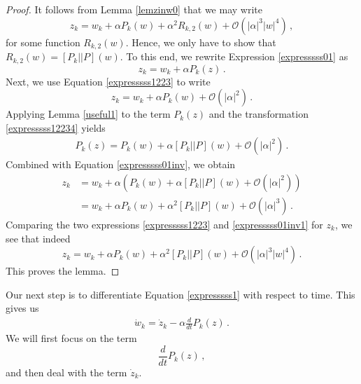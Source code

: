 \documentclass[12pt]{article}
\renewcommand{\mathcal}{\mathscr}
\theoremstyle{plain}
\theoremstyle{definition}
\theoremstyle{remark}
\theoremstyle{remark}
\begin{document}
\begin{proof}
It follows from Lemma \ref{lemzinw0} that we may write
\begin{equation}\label{expresssss1223}
z_k = w_k + \alpha P_k(w) + \alpha^2 R_{k,2}(w) + \mathcal{O}(|\alpha|^3|w|^4)\, ,
\end{equation}
for some function $R_{k,2}(w)$. Hence, we only have to show that $R_{k,2}(w) = [P_k||P](w)$. To this end, we rewrite Expression \eqref{expresssss01} as
\begin{equation}\label{expresssss01inv}
z_k = w_k + \alpha P_k(z) \, .
\end{equation}
Next, we use Equation \eqref{expresssss1223} to write
\begin{equation}\label{expresssss12234}
z_k = w_k + \alpha P_k(w) + \mathcal{O}(|\alpha|^2)\, .
\end{equation}
Applying Lemma \ref{useful1} to the term $P_k(z)$ and the transformation \eqref{expresssss12234} yields
\begin{align}
    P_k(z) = P_k(w) + \alpha [P_k||P](w) + \mathcal{O}(|\alpha|^2)\, .
\end{align}
Combined with Equation \eqref{expresssss01inv}, we obtain
\begin{align}\label{expresssss01inv1}
z_k &= w_k + \alpha (P_k(w) + \alpha [P_k||P](w) + \mathcal{O}(|\alpha|^2)) \\ \nonumber
&= w_k + \alpha P_k(w) + \alpha^2 [P_k||P](w) + \mathcal{O}(|\alpha|^3)\, .
\end{align}
Comparing the two expressions \eqref{expresssss1223} and \eqref{expresssss01inv1} for $z_k$, we see that indeed 
\begin{equation}\label{expresssss122w}
z_k = w_k + \alpha P_k(w) + \alpha^2 [P_k||P](w) + \mathcal{O}(|\alpha|^3|w|^4)\, .
\end{equation}
This proves the lemma.
\end{proof}


Our next step is to differentiate Equation \eqref{expresssss1} with respect to time. This gives us
\begin{align}\label{calcu0001}
\dot{w}_k = \dot{z}_k - \alpha \frac{d}{d t}P_k(z) \, .
\end{align}
We will first focus on the term 
\begin{equation}\label{ddtpkzxx} 
\frac{d}{d t}P_k(z)\, ,
\end{equation}
 and then deal with the term $\dot{z}_k$. \\
\end{document}
